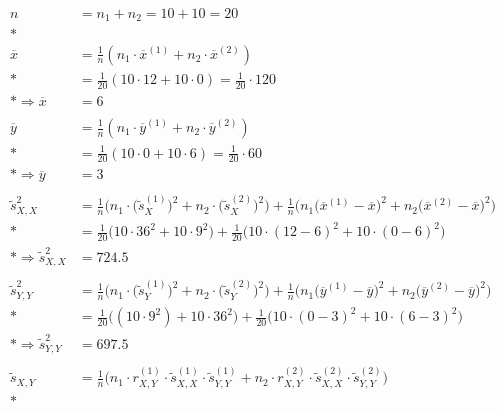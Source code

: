 {\allowdisplaybreaks
    \begin{align*}
        n &= n_1 + n_2 = 10 + 10 = 20 \\*
        \nonumber \\
        \overline{x} &= \frac1n (n_1 \cdot \overline{x}^{(1)} + n_2 \cdot \overline{x}^{(2)}) \\*
        &= \frac{1}{20} (10\cdot12 + 10\cdot0) = \frac{1}{20} \cdot 120 \\*
        \Rightarrow \overline{x} &= 6 \\
        \nonumber \\
        \overline{y} &= \frac1n (n_1 \cdot \overline{y}^{(1)} + n_2 \cdot \overline{y}^{(2)}) \\*
        &= \frac{1}{20} (10\cdot0 + 10\cdot6) = \frac{1}{20} \cdot 60 \\*
        \Rightarrow \overline{y} &= 3 \\
        \nonumber \\
        \tilde{s}_{X,X}^2 &= \frac{1}{n} \Big( n_1 \cdot \big( \tilde{s}_X^{(1)} \big)^2 + n_2 \cdot \big( \tilde{s}_X^{(2)} \big)^2 \Big)
            + \frac1n \Big( n_1 \big( \overline{x}^{(1)} - \overline{x} \big)^2 + n_2 \big( \overline{x}^{(2)} - \overline{x} \big)^2 \Big) \\*
        &= \frac{1}{20} \big(10\cdot36^2 + 10\cdot9^2 \big) + \frac{1}{20} \big( 10\cdot (12 - 6)^2 + 10 \cdot (0 - 6)^2 \big) \\*
        \Rightarrow \tilde{s}_{X,X}^2 &= 724.5 \\
        \nonumber \\
        \tilde{s}_{Y,Y}^2 &= \frac{1}{n} \Big( n_1 \cdot \big( \tilde{s}_Y^{(1)} \big)^2 + n_2 \cdot \big( \tilde{s}_Y^{(2)} \big)^2 \Big)
            + \frac1n \Big( n_1 \big( \overline{y}^{(1)} - \overline{y} \big)^2 + n_2 \big( \overline{y}^{(2)} - \overline{y} \big)^2 \Big) \\*
        &= \frac{1}{20} \big( (10\cdot9^2) + 10\cdot36^2 \big) + \frac{1}{20} \big( 10\cdot(0-3)^2 + 10\cdot(6-3)^2 \big) \\*
        \Rightarrow \tilde{s}_{Y,Y}^2 &= 697.5\\
        \nonumber \\
        \tilde{s}_{X,Y} &= \frac1n \big( n_1 \cdot r_{X,Y}^{(1)} \cdot \tilde{s}_{X,X}^{(1)} \cdot \tilde{s}_{Y,Y}^{(1)}
            + n_2 \cdot r_{X,Y}^{(2)} \cdot \tilde{s}_{X,X}^{(2)} \cdot \tilde{s}_{Y,Y}^{(2)} \big) \\*

\end{align*}}
